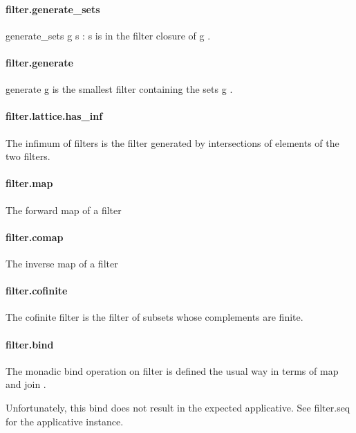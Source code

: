 \documentclass{article}
\begin{document}
\paragraph{filter.generate\_sets}
\par
\colorbox[RGB]{253,246,227}{{{{\color[RGB]{101, 123, 131} generate\_sets g s }}}}: 
\colorbox[RGB]{253,246,227}{{{{\color[RGB]{101, 123, 131} s }}}} is in the filter closure of 
\colorbox[RGB]{253,246,227}{{{{\color[RGB]{101, 123, 131} g }}}}.
\paragraph{filter.generate}
\par
\colorbox[RGB]{253,246,227}{{{{\color[RGB]{101, 123, 131} generate g }}}} is the smallest filter containing the sets 
\colorbox[RGB]{253,246,227}{{{{\color[RGB]{101, 123, 131} g }}}}.
\paragraph{filter.lattice.has\_inf}
\par
The infimum of filters is the filter generated by intersections
of elements of the two filters.
\paragraph{filter.map}
\par
The forward map of a filter
\paragraph{filter.comap}
\par
The inverse map of a filter
\paragraph{filter.cofinite}
\par
The cofinite filter is the filter of subsets whose complements are finite.
\paragraph{filter.bind}
\par
The monadic bind operation on filter is defined the usual way in terms of 
\colorbox[RGB]{253,246,227}{{{{\color[RGB]{101, 123, 131} map }}}} and 
\colorbox[RGB]{253,246,227}{{{{\color[RGB]{101, 123, 131} join }}}}.
\par
Unfortunately, this 
\colorbox[RGB]{253,246,227}{{{{\color[RGB]{101, 123, 131} bind }}}} does not result in the expected applicative. See 
\colorbox[RGB]{253,246,227}{{{{\color[RGB]{101, 123, 131} filter.seq }}}} for the
applicative instance.
\end{document}
